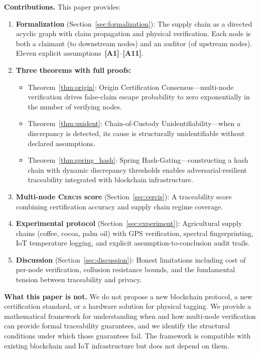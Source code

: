 \documentclass[11pt,a4paper]{article}
\theoremstyle{definition}
\theoremstyle{remark}
\newcommand{\assumptionTag}[1]{\textsf{\textbf{[A#1]}}}
\newcommand{\Cercis}{\textsc{Cercis}}
\begin{document}
\textbf{Contributions.} This paper provides:

\begin{enumerate}[label=(\roman*)]
    \item \textbf{Formalization} (Section~\ref{sec:formalization}): The supply chain as a directed acyclic graph with claim propagation and physical verification. Each node is both a claimant (to downstream nodes) and an auditor (of upstream nodes). Eleven explicit assumptions~\assumptionTag{1}--\assumptionTag{11}.
    \item \textbf{Three theorems with full proofs:}
    \begin{itemize}
        \item Theorem~\ref{thm:origin}: Origin Certification Consensus---multi-node verification drives false-claim escape probability to zero exponentially in the number of verifying nodes.
        \item Theorem~\ref{thm:unident}: Chain-of-Custody Unidentifiability---when a discrepancy is detected, its cause is structurally unidentifiable without declared assumptions.
        \item Theorem~\ref{thm:spring_hash}: Spring Hash-Gating---constructing a hash chain with dynamic discrepancy thresholds enables adversarial-resilient traceability integrated with blockchain infrastructure.
    \end{itemize}
    \item \textbf{Multi-node \Cercis{} score} (Section~\ref{sec:cercis}): A traceability score combining certification accuracy and supply chain regime coverage.
    \item \textbf{Experimental protocol} (Section~\ref{sec:experiment}): Agricultural supply chains (coffee, cocoa, palm oil) with GPS verification, spectral fingerprinting, IoT temperature logging, and explicit assumption-to-conclusion audit trails.
    \item \textbf{Discussion} (Section~\ref{sec:discussion}): Honest limitations including cost of per-node verification, collusion resistance bounds, and the fundamental tension between traceability and privacy.
\end{enumerate}

\textbf{What this paper is not.} We do not propose a new blockchain protocol, a new certification standard, or a hardware solution for physical tagging. We provide a mathematical framework for understanding when and how multi-node verification can provide formal traceability guarantees, and we identify the structural conditions under which those guarantees fail. The framework is compatible with existing blockchain and IoT infrastructure but does not depend on them.
\end{document}

